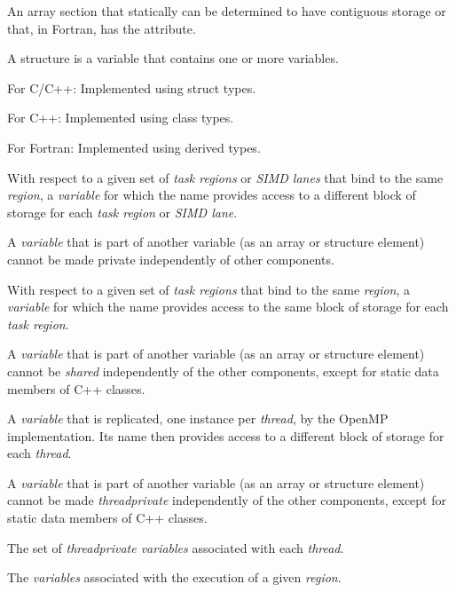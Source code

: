 \glossarydefstart
An array section that statically can be determined to have contiguous 
storage or that, in Fortran, has the  attribute.
\glossarydefend
\bigskip

\glossarydefstart
A structure is a variable that contains one or more variables.

For C/C++:
\nopagebreak
Implemented using struct types.

For C++:
\nopagebreak
Implemented using class types.

For Fortran:
\nopagebreak
Implemented using derived types.
\glossarydefend

\glossarydefstart
With respect to a given set of \emph{task regions} or \emph{SIMD lanes} 
that bind to the same  \emph{region}, a \emph{variable} 
for which the name provides access to a different block of
storage for each \emph{task region} or \emph{SIMD lane}.

A \emph{variable} that is part of another variable (as an array or 
structure element) cannot be made private independently of other components.
\glossarydefend

\glossarydefstart
With respect to a given set of \emph{task regions} that bind to the same 
 \emph{region}, a \emph{variable} for which the name 
provides access to the same block of storage for each \emph{task region}.

A \emph{variable} that is part of another variable (as an array or 
structure element) cannot be \emph{shared} independently of the other 
components, except for static data members of C++ classes.
\glossarydefend

\glossarydefstart
A \emph{variable} that is replicated, one instance per \emph{thread}, by the 
OpenMP implementation. Its name then provides access to a different block of 
storage for each \emph{thread}.

A \emph{variable} that is part of another variable (as an array or structure 
element) cannot be made \emph{threadprivate} independently of the other 
components, except for static data members of C++ classes.
\glossarydefend

\glossarydefstart
The set of \emph{threadprivate variables} associated with each \emph{thread}.
\glossarydefend

\glossarydefstart
The \emph{variables} associated with the execution of a given \emph{region}.
\glossarydefend


